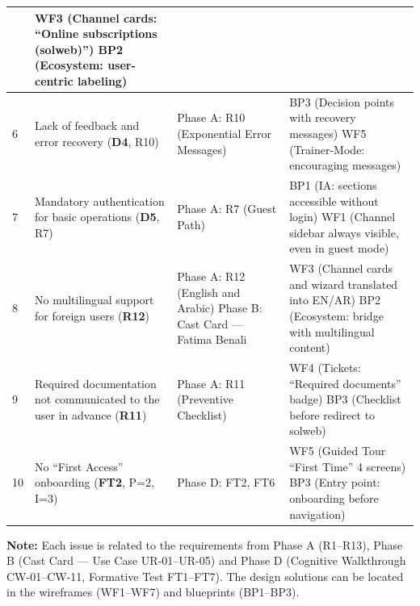 ﻿\documentclass[11pt,a4paper]{article}
\begin{document}
\begin{longtable}{|p{0.8cm}|p{3.2cm}|p{3.3cm}|p{6.2cm}|}
& WF3 (Channel cards: ``Online subscriptions (solweb)'') \newline BP2 (Ecosystem: user-centric labeling) \\
\hline
6 & Lack of feedback and error recovery (\textbf{D4}, R10) 
& Phase A: R10 (Exponential Error Messages)
& BP3 (Decision points with recovery messages) \newline WF5 (Trainer-Mode: encouraging messages) \\
\hline
7 & Mandatory authentication for basic operations (\textbf{D5}, R7) 
& Phase A: R7 (Guest Path)
& BP1 (IA: sections accessible without login) \newline WF1 (Channel sidebar always visible, even in guest mode) \\
\hline
8 & No multilingual support for foreign users (\textbf{R12}) 
& Phase A: R12 (English and Arabic) \newline Phase B: Cast Card --- Fatima Benali
& WF3 (Channel cards and wizard translated into EN/AR) \newline BP2 (Ecosystem: bridge with multilingual content) \\
\hline
9 & Required documentation not communicated to the user in advance (\textbf{R11}) 
& Phase A: R11 (Preventive Checklist)
& WF4 (Tickets: ``Required documents'' badge) \newline BP3 (Checklist before redirect to solweb) \\
\hline
10 & No ``First Access'' onboarding (\textbf{FT2}, P=2, I=3) 
& Phase D: FT2, FT6
& WF5 (Guided Tour ``First Time'' 4 screens) \newline BP3 (Entry point: onboarding before navigation) \\
\hline
\end{longtable}

\vspace{0.3cm}

\begin{tcolorbox}[summarybox]
\small
\textbf{Note:} Each issue is related to the requirements from Phase A (R1--R13), Phase B (Cast Card --- Use Case UR-01--UR-05) and Phase D (Cognitive Walkthrough CW-01--CW-11, Formative Test FT1--FT7). The design solutions can be located in the wireframes (WF1--WF7) and blueprints (BP1--BP3).
\end{tcolorbox}

\end{document}
